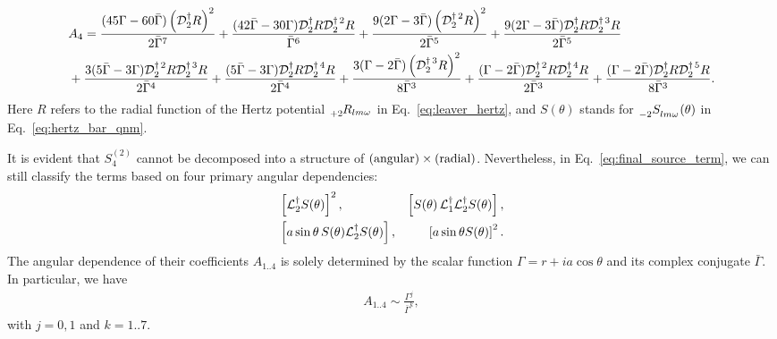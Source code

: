 \documentclass[aps,prd,amsmath,floats,floatfix, twocolumn,
superscriptaddress,nofootinbib,showpacs]{revtex4-1}
\begin{document}
\begin{widetext}
\begin{align}
    &A_4=\frac{(45 \Gamma-60\bar{\Gamma}) \left(\mathcal{D}^{\dagger}_2R\right)^2}{2\bar{\Gamma}^7} +
\frac{(42\bar{\Gamma}-30 \Gamma) \mathcal{D}^{\dagger}_2R \mathcal{D}^{\dagger\,2}_2R}{\bar{\Gamma}^6}  +
\frac{9(2 \Gamma-3\bar{\Gamma}) \left(\mathcal{D}^{\dagger\,2}_2R\right)^2}{2\bar{\Gamma}^5} +
\frac{9(2 \Gamma-3\bar{\Gamma}) \mathcal{D}^{\dagger}_2R \mathcal{D}^{\dagger\,3}_2R}{2\bar{\Gamma}^5} \notag \\
& +
\frac{3(5\bar{\Gamma}-3\Gamma) \mathcal{D}^{\dagger\,2}_2R \mathcal{D}^{\dagger\,3}_2R}{2\bar{\Gamma}^4}+
\frac{(5\bar{\Gamma}-3\Gamma) \mathcal{D}^{\dagger}_2R \mathcal{D}^{\dagger\,4}_2R}{2\bar{\Gamma}^4}   +
\frac{3( \Gamma-2 \bar{\Gamma}) \left(\mathcal{D}^{\dagger\,3}_2R\right)^2}{8\bar{\Gamma}^3}  +
\frac{(\Gamma-2\bar{\Gamma}) \mathcal{D}^{\dagger\,2}_2R \mathcal{D}^{\dagger\,4}_2R}{2\bar{\Gamma}^3} +
\frac{(\Gamma-2\bar{\Gamma}) \mathcal{D}^{\dagger}_2R \mathcal{D}^{\dagger\,5}_2R}{8\bar{\Gamma}^3}.
\end{align}
Here $R$ refers to the radial function of the Hertz potential $\tensor[_{+2}]{{R_{lm\omega}}}{}$ in Eq.~\eqref{eq:leaver_hertz}, and $S(\theta)$ stands for $\tensor[_{-2}]{S}{_{lm\omega}}(\theta)$ in Eq.~\eqref{eq:hertz_bar_qnm}.
\end{widetext}
It is evident that $S_4^{(2)}$ cannot be decomposed into a structure of $(\rm{angular})\times(\rm{radial})$. Nevertheless, in Eq.~\eqref{eq:final_source_term}, we can still classify the terms based on four primary angular dependencies:
\begin{align}
    &\left[\mathcal{L}_2^\dagger S(\theta)\right]^2,   &\left[S(\theta)\,\mathcal{L}_1^\dagger\mathcal{L}_2^\dagger S(\theta)\right],  \notag \\
    &\left[a\sin\theta\,S(\theta) \mathcal{L}_2^\dagger S(\theta) \right], &\left[a\sin\theta S(\theta)\right]^2. \notag 
\end{align}
The angular dependence of their coefficients $A_{1..4}$ is solely determined by the scalar function $\Gamma=r+ia\cos\theta$ and its complex conjugate $\bar{\Gamma}$. In particular, we have
\begin{align}
    A_{1..4}\sim \frac{\Gamma^j}{\bar{\Gamma}^k},
\end{align}
with $j=0,1$ and $k=1..7$.
\end{document}
